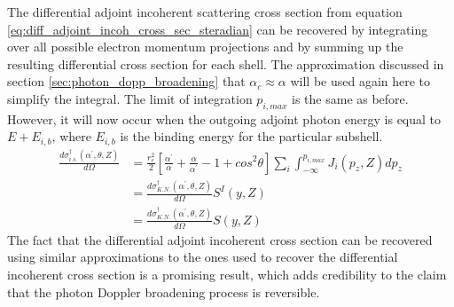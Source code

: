 The differential adjoint incoherent scattering cross section from equation
\ref{eq:diff_adjoint_incoh_cross_sec_steradian} can be recovered by integrating
over all possible electron momentum projections and by summing up the resulting
differential cross section for each shell. The approximation discussed in
section \ref{sec:photon_dopp_broadening} that $\alpha_c \approx \alpha$ will
be used again here to simplify the integral. The limit of integration
$p_{i,max}$ is the same as before. However, it will now occur when the outgoing
adjoint photon energy is equal to $E+E_{i,b}$, where $E_{i,b}$ is the binding
energy for the particular subshell. 
\begin{align}
  \frac{d\sigma_{i.s.}^{\dagger}(\alpha^{'},\theta,Z)}{d\Omega} & = 
  \frac{r_e^2}{2}\left[\frac{\alpha^{'}}{\alpha} + \frac{\alpha}{\alpha^{'}} - 1
    + cos^2\theta \right] \sum_i \int_{-\infty}^{p_{i,max}} J_i(p_z,Z)dp_z \nonumber\\
  & = \frac{d\sigma_{K.N.}^{\dagger}(\alpha^{'},\theta,Z)}{d\Omega} S^I(y,Z) 
  \nonumber \\
  & = \frac{d\sigma_{K.N.}^{\dagger}(\alpha^{'},\theta,Z)}{d\Omega} S(y,Z) 
  \nonumber
\end{align}
The fact that the differential adjoint incoherent cross section can be recovered
using similar approximations to the ones used to recover the differential 
incoherent cross section is a promising result, which adds credibility to the
claim that the photon Doppler broadening process is reversible. 

